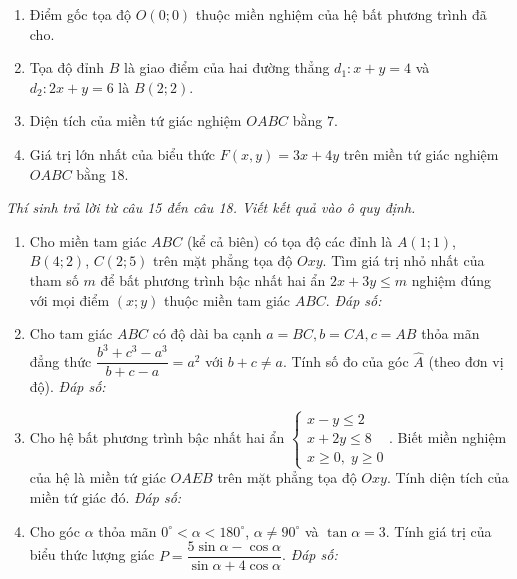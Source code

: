 \documentclass[12pt,a4paper]{article}
\newcommand{\parttitle}[1]{\par\vspace{2pt}{\large\bfseries\color{ink}#1}\par\vspace{1pt}}
\newcommand{\answerbox}{\hfill\textit{Đáp số:}\ \fbox{\rule{0pt}{11pt}\hspace{2.2cm}}}
\begin{document}
\begin{enumerate}[resume]
\begin{center}
\end{center}

\begin{enumerate}
    \item Điểm gốc tọa độ $O(0; 0)$ thuộc miền nghiệm của hệ bất phương trình đã cho.
    \item Tọa độ đỉnh $B$ là giao điểm của hai đường thẳng $d_1: x + y = 4$ và $d_2: 2x + y = 6$ là $B(2; 2)$.
    \item Diện tích của miền tứ giác nghiệm $OABC$ bằng $7$.
    \item Giá trị lớn nhất của biểu thức $F(x, y) = 3x + 4y$ trên miền tứ giác nghiệm $OABC$ bằng $18$.
\end{enumerate}
\end{enumerate}

\parttitle{PHẦN III. Trắc nghiệm trả lời ngắn}
\textit{Thí sinh trả lời từ câu 15 đến câu 18. Viết kết quả vào ô quy định.}
\begin{enumerate}[resume]
\item Cho miền tam giác $ABC$ (kể cả biên) có tọa độ các đỉnh là $A(1; 1)$, $B(4; 2)$, $C(2; 5)$ trên mặt phẳng tọa độ $Oxy$. Tìm giá trị nhỏ nhất của tham số $m$ để bất phương trình bậc nhất hai ẩn $2x + 3y \le m$ nghiệm đúng với mọi điểm $(x; y)$ thuộc miền tam giác $ABC$.
\answerbox

\item Cho tam giác $ABC$ có độ dài ba cạnh $a = BC, b = CA, c = AB$ thỏa mãn đẳng thức $\dfrac{b^3 + c^3 - a^3}{b + c - a} = a^2$ với $b + c \ne a$. Tính số đo của góc $\widehat{A}$ (theo đơn vị độ).
\answerbox

\item Cho hệ bất phương trình bậc nhất hai ẩn $\begin{cases} x - y \le 2 \\ x + 2y \le 8 \\ x \ge 0,\; y \ge 0 \end{cases}$. Biết miền nghiệm của hệ là miền tứ giác $OAEB$ trên mặt phẳng tọa độ $Oxy$. Tính diện tích của miền tứ giác đó.
\answerbox

\item Cho góc $\alpha$ thỏa mãn $0^\circ < \alpha < 180^\circ$, $\alpha \ne 90^\circ$ và $\tan \alpha = 3$. Tính giá trị của biểu thức lượng giác $P = \dfrac{5\sin \alpha - \cos \alpha}{\sin \alpha + 4\cos \alpha}$.
\answerbox
\end{enumerate}
\end{document}
